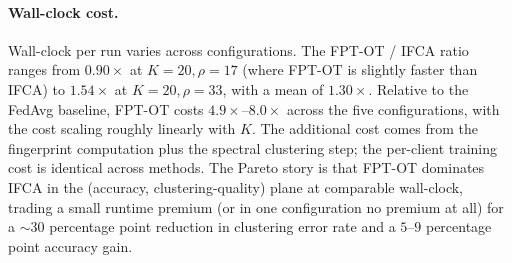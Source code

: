 \paragraph{Wall-clock cost.}
Wall-clock per run varies across configurations. The FPT-OT / IFCA ratio ranges from $0.90\times$ at $K{=}20, \rho{=}17$ (where FPT-OT is slightly faster than IFCA) to $1.54\times$ at $K{=}20, \rho{=}33$, with a mean of $1.30\times$. Relative to the FedAvg baseline, FPT-OT costs $4.9\times$--$8.0\times$ across the five configurations, with the cost scaling roughly linearly with $K$. The additional cost comes from the fingerprint computation plus the spectral clustering step; the per-client training cost is identical across methods. The Pareto story is that FPT-OT dominates IFCA in the (accuracy, clustering-quality) plane at comparable wall-clock, trading a small runtime premium (or in one configuration no premium at all) for a $\sim 30$ percentage point reduction in clustering error rate and a $5$--$9$ percentage point accuracy gain.

